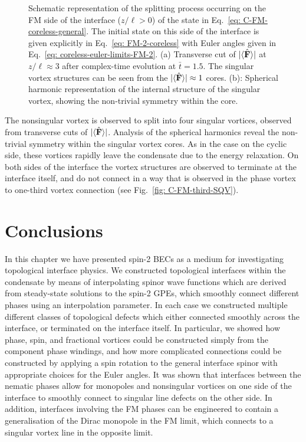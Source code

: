 \begin{figure}
    \caption[Dynamics of a nonsingular vortex connected across a cyclic to
        ferromagnetic interface]
    {\label{fig: C-FM-coreless-FM}Schematic representation of the
        splitting process occurring on the FM side of the interface
        (\(z/\ell > 0\)) of the state in Eq.~\eqref{eq: C-FM-coreless-general}.
        The initial state on this side of the interface is given explicitly in
        Eq.~\eqref{eq: FM-2-coreless} with Euler angles given in
        Eq.~\eqref{eq: coreless-euler-limits-FM-2}.
        (a) Transverse cut of \(|\langle \hat{\vb{F}} \rangle | \) at \(z/\ell \approx 3\) after
        complex-time evolution at \(\bar{t} = 1.5\).
        The singular vortex structures can be seen from the
        \(|\langle \hat{\vb{F}} \rangle | \approx 1\) cores.
        (b): Spherical harmonic representation of the internal structure of
        the singular vortex, showing the non-trivial symmetry within the core.}
\end{figure}
The nonsingular vortex is observed to split into four singular vortices,
observed from transverse cuts of \(|\langle \hat{\vb{F}} \rangle | \).
Analysis of the spherical harmonics reveal the non-trivial symmetry within
the singular vortex cores.
As in the case on the cyclic side, these vortices rapidly leave the condensate
due to the energy relaxation.
On both sides of the interface the vortex structures are observed to terminate
at the interface itself, and do not connect in a way that is observed in the
phase vortex to one-third vortex connection (see
Fig.~\ref{fig: C-FM-third-SQV}).

\section{Conclusions}
In this chapter we have presented spin-2 BECs as a medium for investigating
topological interface physics.
We constructed topological interfaces within the condensate by means of
interpolating spinor wave functions which are derived from steady-state
solutions to the spin-2 GPEs, which smoothly connect different phases using
an interpolation parameter.
In each case we constructed multiple different classes of topological defects
which either connected smoothly across the interface, or terminated on the
interface itself.
In particular, we showed how phase, spin, and fractional vortices could be
constructed simply from the component phase windings, and how more complicated
connections could be constructed by applying a spin rotation to the general
interface spinor with appropriate choices for the Euler angles.
It was shown that interfaces between the nematic phases allow for monopoles and
nonsingular vortices on one side of the interface to smoothly connect to
singular line defects on the other side.
In addition, interfaces involving the FM phases can be engineered to contain
a generalisation of the Dirac monopole in the FM limit, which connects to a
singular vortex line in the opposite limit.

